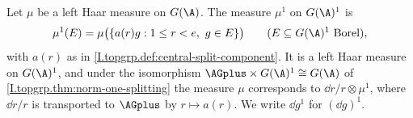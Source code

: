 Let $\mu$ be a left Haar measure on $G(\A)$. The measure $\mu^1$ on $G(\A)^1$ is
\[
  \mu^1(E)=\mu\bigl(\{a(r)g:1\le r<e,\ g\in E\}\bigr)\qquad(E\subseteq G(\A)^1\text{ Borel}),
\]
with $a(r)$ as in \cref{I.topgrp.def:central-split-component}. It is a left Haar measure on $G(\A)^1$, and under the
isomorphism $\AGplus\times G(\A)^1\cong G(\A)$ of \cref{I.topgrp.thm:norm-one-splitting} the measure $\mu$ corresponds
to $\dd r/r\otimes\mu^1$, where $\dd r/r$ is transported to $\AGplus$ by $r\mapsto a(r)$. We write $\dd g^1$ for
$(\dd g)^1$.
